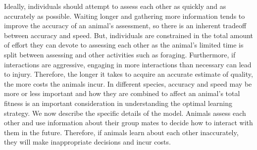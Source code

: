 Ideally, individuals should attempt to assess each other as quickly and as accurately as possible. Waiting longer and gathering more information tends to improve the accuracy of an animal's assessment, so there is an inherent tradeoff between accuracy and speed. But, individuals are constrained in the total amount of effort they can devote to assessing each other as the animal's limited time is split between assessing and other activities such as foraging. Furthermore, if interactions are aggressive, engaging in more interactions than necessary can lead to injury. Therefore, the longer it takes to acquire an accurate estimate of quality, the more costs the animals incur. In different species, accuracy and speed may be more or less important and how they are combined to affect an animal's total fitness is an important consideration in understanding the optimal learning strategy. We now describe the specific details of the model. Animals assess each other and use information about their group mates to decide how to interact with them in the future. Therefore, if animals learn about each other inaccurately, they will make inappropriate decisions and incur costs. 


